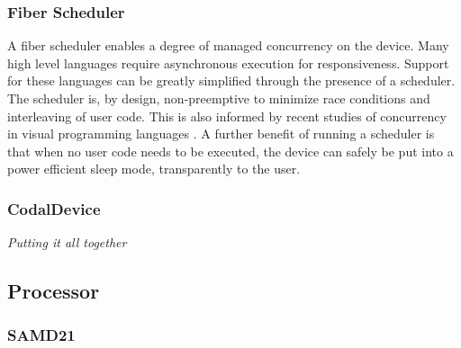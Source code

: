 \subsubsection{Fiber Scheduler}

A fiber scheduler enables a degree of managed concurrency on the device. Many high level languages require asynchronous
execution for responsiveness. Support for these languages can be greatly simplified through the presence of a scheduler. 
The scheduler is, by design, non-preemptive to minimize race conditions and interleaving of user code. This is also informed
by recent studies of concurrency in visual programming languages \cite{meerbaum2013learning}. A further benefit of running a 
scheduler is that when no user code needs to be executed, the device can safely be put into a power efficient sleep mode,
transparently to the user.

\subsubsection{CodalDevice}

\emph{Putting it all together}


\subsection{Processor}

\subsubsection{SAMD21}
